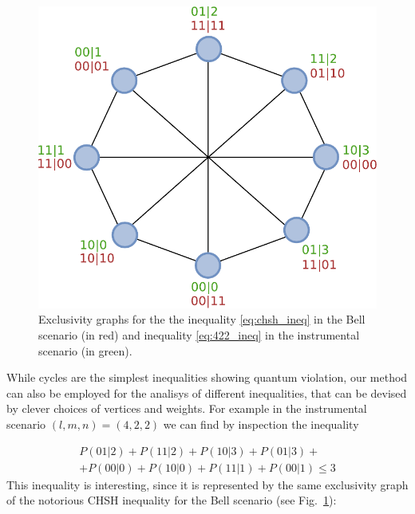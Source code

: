 \documentclass[letterpaper]{article}
\begin{document}
\begin{figure}[t]
    \centering
        \includegraphics[width=\columnwidth]{images/gclmp_graphs.pdf}
        \caption{Exclusivity graphs for the the inequality \eqref{eq:chsh_ineq} in the Bell
        scenario (in red) and inequality \eqref{eq:422_ineq} in the instrumental
    scenario (in green).}
        \label{fig:422_exgraph}
\end{figure}

While cycles are the simplest inequalities showing quantum violation, our method
can also be employed for the analisys of different inequalities, that can be 
devised by clever choices of vertices and weights. 
For example in the instrumental scenario $(l,m,n) = (4,2,2)$ we can find by inspection the inequality 


\begin{multline}
    P(01\vert2) + P(11\vert2) + P(10\vert3) + P(01\vert3) + \\
     + P(00\vert0) + P(10\vert0) + P(11\vert1) + P(00\vert1) \le 3
    \label{eq:422_ineq}
\end{multline}
This inequality is interesting, since it is represented by the same exclusivity graph of the notorious CHSH inequality \cite{CHSH} for the Bell scenario (see Fig.~\ref{fig:422_exgraph}): 
\end{document}
